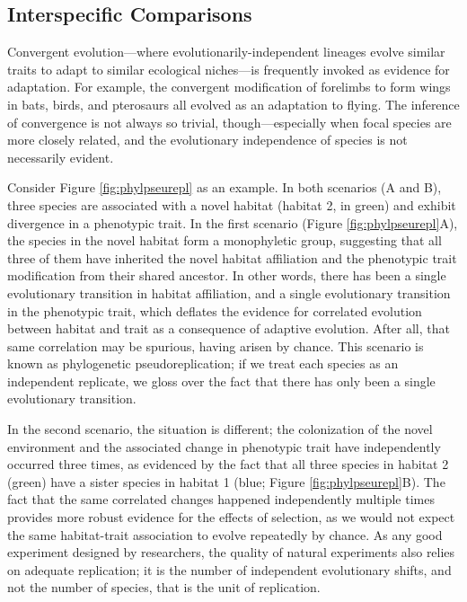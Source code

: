 \documentclass[
]{book}
\begin{document}
\hypertarget{interspecific-comparisons}{%
\subsection{Interspecific Comparisons}\label{interspecific-comparisons}}

Convergent evolution---where evolutionarily-independent lineages evolve similar traits to adapt to similar ecological niches---is frequently invoked as evidence for adaptation. For example, the convergent modification of forelimbs to form wings in bats, birds, and pterosaurs all evolved as an adaptation to flying. The inference of convergence is not always so trivial, though---especially when focal species are more closely related, and the evolutionary independence of species is not necessarily evident.

Consider Figure \ref{fig:phylpseurepl} as an example. In both scenarios (A and B), three species are associated with a novel habitat (habitat 2, in green) and exhibit divergence in a phenotypic trait. In the first scenario (Figure \ref{fig:phylpseurepl}A), the species in the novel habitat form a monophyletic group, suggesting that all three of them have inherited the novel habitat affiliation and the phenotypic trait modification from their shared ancestor. In other words, there has been a single evolutionary transition in habitat affiliation, and a single evolutionary transition in the phenotypic trait, which deflates the evidence for correlated evolution between habitat and trait as a consequence of adaptive evolution. After all, that same correlation may be spurious, having arisen by chance. This scenario is known as phylogenetic pseudoreplication; if we treat each species as an independent replicate, we gloss over the fact that there has only been a single evolutionary transition.

In the second scenario, the situation is different; the colonization of the novel environment and the associated change in phenotypic trait have independently occurred three times, as evidenced by the fact that all three species in habitat 2 (green) have a sister species in habitat 1 (blue; Figure \ref{fig:phylpseurepl}B). The fact that the same correlated changes happened independently multiple times provides more robust evidence for the effects of selection, as we would not expect the same habitat-trait association to evolve repeatedly by chance. As any good experiment designed by researchers, the quality of natural experiments also relies on adequate replication; it is the number of independent evolutionary shifts, and not the number of species, that is the unit of replication.
\end{document}
